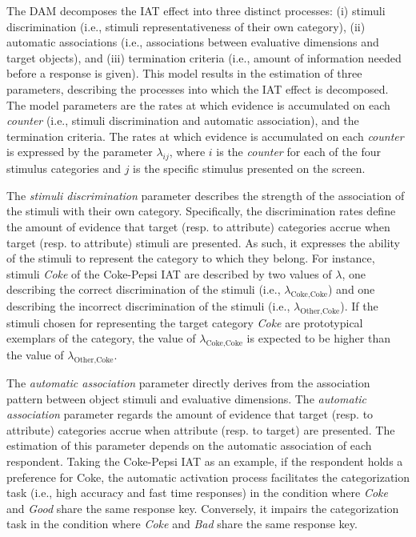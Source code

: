 \documentclass[12pt]{book}
\begin{document}
The DAM decomposes the IAT effect into three distinct processes: (i) stimuli discrimination (i.e., stimuli representativeness of their own category), (ii) automatic associations (i.e., associations between evaluative dimensions and target objects), and (iii) termination criteria (i.e., amount of information needed before a response is given). 
This model results in the estimation of three parameters, describing the processes into which the IAT effect is decomposed. The model parameters are the rates at which evidence is accumulated on each \emph{counter} (i.e., stimuli discrimination and automatic association), and the termination criteria. The rates at which evidence is accumulated on each \emph{counter} is expressed by the parameter $\lambda_{ij}$, where $i$ is the \emph{counter} for each of the four stimulus categories and $j$ is the specific stimulus presented on the screen.

The \emph{stimuli discrimination} parameter describes the strength of the association of the stimuli with their own category.  
Specifically, the discrimination rates define the amount of evidence that target (resp. to attribute) categories accrue when target (resp. to attribute) stimuli are presented. 
As such, it expresses the ability of the stimuli to represent the category to which they belong.
For instance, stimuli \emph{Coke} of the Coke-Pepsi IAT are described by two values of $\lambda$, one describing the correct discrimination of the stimuli (i.e., $\lambda_{\text{Coke}, \text{Coke}}$) and one describing the incorrect discrimination of the stimuli (i.e., $\lambda_{\text{Other}, \text{Coke}}$). If the stimuli chosen for representing the target category \emph{Coke} are prototypical exemplars of the category, the value of $\lambda_{\text{Coke}, \text{Coke}}$ is expected to be higher than the value of $\lambda_{\text{Other}, \text{Coke}}$. 


The \emph{automatic association} parameter directly derives from the association pattern between object stimuli and evaluative dimensions.
The \emph{automatic association} parameter regards the amount of evidence that target (resp. to attribute) categories accrue when attribute (resp. to target) are presented. 
The estimation of this parameter depends on the automatic association of each respondent. 
Taking the Coke-Pepsi IAT as an example, if the respondent holds a preference for Coke, the automatic activation process facilitates the categorization task (i.e., high accuracy and fast time responses) in the condition where \emph{Coke} and \emph{Good} share the same response key. 
Conversely, it impairs the categorization task in the condition where \emph{Coke} and \emph{Bad} share the same response key.
\end{document}
